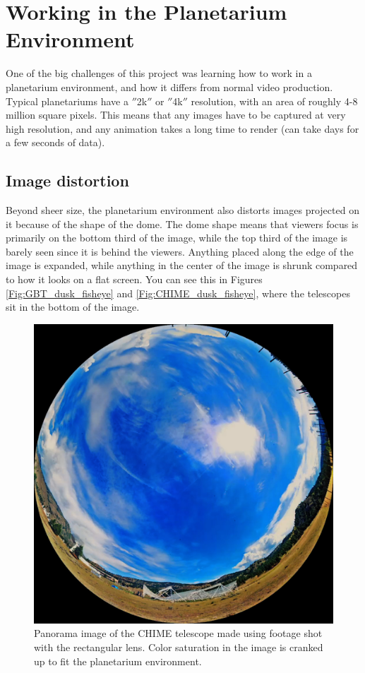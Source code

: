 \section{Working in the Planetarium Environment}

One of the big challenges of this project was learning how to work in a planetarium environment, and how it differs from normal video production. Typical planetariums have a $''$2k$''$ or $''$4k$''$ resolution, with an area of roughly 4-8 million square pixels. This means that any images have to be captured at very high resolution, and any animation takes a long time to render (can take days for a few seconds of data). 


\subsection{Image distortion}

Beyond sheer size, the planetarium environment also distorts images projected on it because of the shape of the dome. The dome shape means that viewers focus is primarily on the bottom third of the image, while the top third of the image is barely seen since it is behind the viewers. Anything placed along the edge of the image is expanded, while anything in the center of the image is shrunk compared to how it looks on a flat screen. You can see this in Figures \ref{Fig:GBT_dusk_fisheye} and \ref{Fig:CHIME_dusk_fisheye}, where the telescopes sit in the bottom of the image. 

\begin{figure}[htb]
\begin{center}
\includegraphics[width=0.95\linewidth]{Planetarium/figures/CHIME_day_dome.jpg}
\caption{Panorama image of the CHIME telescope made using footage shot with the rectangular lens. Color saturation in the image is cranked up to fit the planetarium environment.}
\label{Fig:CHIME_day}
\end{center}
\end{figure}

